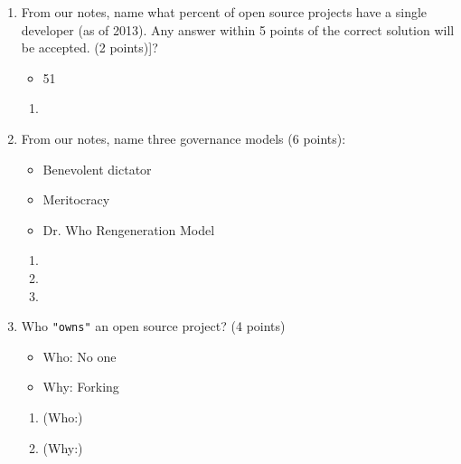 \documentclass[10pt]{article}
\begin{document}
\begin{enumerate}
\begin{enumerate}
\begin{enumerate}
	\bigskip
	\bigskip
	\item
	\bigskip
	\bigskip
	\item 
	\bigskip
	\bigskip
	\item 
\bigskip
\bigskip
\end{enumerate}
\fi
\bigskip
\bigskip
\item From our notes, name what percent of open source projects have a single developer (as of 2013). Any answer within 5 points of the correct solution will be accepted. (2 points)]?
\beginanswers
\begin{itemize}
	\item 51%
\end{itemize}
\else
\begin{enumerate}
	\item
	\bigskip
	\bigskip
\end{enumerate}
\fi
\bigskip
\bigskip
\item From our notes, name three governance models (6 points):
\beginanswers
\begin{itemize}
	\item Benevolent dictator
	\item Meritocracy
	\item Dr. Who Rengeneration Model
\end{itemize}
\else
\begin{enumerate}
	\item 
	\bigskip
	\bigskip
	\item
	\bigskip
	\bigskip
	\item 
	\bigskip
	\bigskip
\end{enumerate}
\fi
\bigskip
\bigskip
\item Who \verb|"owns"| an open source project? (4 points)
\beginanswers
\begin{itemize}
	\item Who: No one
	\item Why: Forking
	\end{itemize}
\else
\begin{enumerate}
	\item (Who:)
	\bigskip
	\bigskip
	\item (Why:)
	\bigskip
	\bigskip
	\end{enumerate}
\fi
\end{enumerate}


\end{enumerate}
\end{document}
